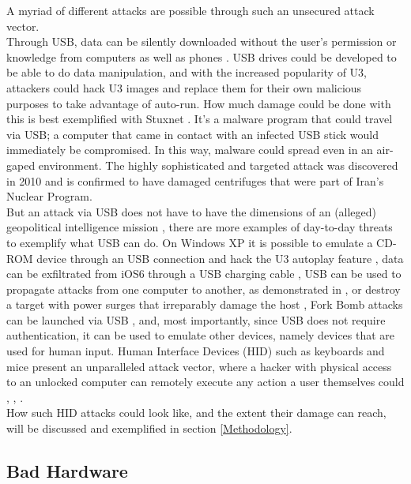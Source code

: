 A myriad of different attacks are possible through such an unsecured attack vector.\\
Through USB, data can be silently downloaded without the user's permission or knowledge from computers \cite{clarkHardwareTrojanHorse2009} as well as phones \cite{SharpIdeasDownloads2006}. USB drives could be developed to be able to do data manipulation, and with the increased popularity of U3, attackers could hack U3 images and replace them for their own malicious purposes to take advantage of auto-run. 
How much damage could be done with this is best exemplified with Stuxnet \cite{kushnerRealStoryStuxnet2013}. It's a malware program that could travel via USB; a computer that came in contact with an infected USB stick would immediately be compromised. In this way, malware could spread even in an air-gaped environment. The highly sophisticated and targeted attack was discovered in 2010 and is confirmed to have damaged centrifuges that were part of Iran's Nuclear Program.\\
But an attack via USB does not have to have the dimensions of an (alleged) geopolitical intelligence mission \cite{kushnerRealStoryStuxnet2013}, there are more examples of day-to-day threats to exemplify what USB can do. On Windows XP it is possible to emulate a CD-ROM device through an USB connection and hack the U3 autoplay feature \cite{al-zarouniRealityRisksConsented2006}, data can be exfiltrated from iOS6 through a USB charging cable \cite{lauMactansInjectingMalware2013}, USB can be used to propagate attacks from one computer to another, as demonstrated in \cite{wangExploitingSmartphoneUSB2010}, or destroy a target with power surges that irreparably damage the host \cite{USBKillDevices}, Fork Bomb attacks can be launched via USB \cite{efendyExploringPossibilityUSB2019}, and, most importantly, since USB does not require authentication, it can be used to emulate other devices, namely devices that are used for human input. Human Interface Devices (HID) such as keyboards and mice present an unparalleled attack vector, where a hacker with physical access to an unlocked computer can remotely execute any action a user themselves could \cite{USBRubberDucky}, \cite{MGCable2019a}, \cite{lawalFacilitatingCyberenabledFraud2022}. \\
How such HID attacks could look like, and the extent their damage can reach, will be discussed and exemplified in section \ref{Methodology}.

\subsection{Bad Hardware}

